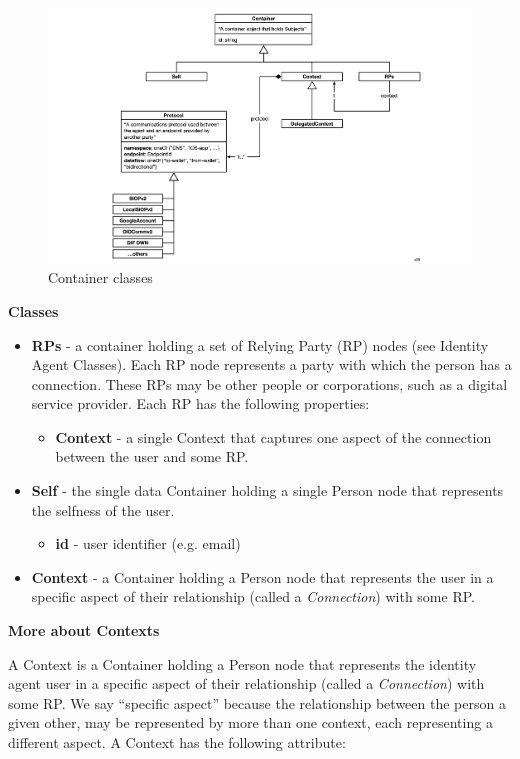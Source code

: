 \documentclass[11pt, oneside]{article}   	%
\begin{document}
\begin{figure}[h!]
\includegraphics[width=\textwidth]{./images/container-classes.png}
\caption{Container classes}
\label{fig:containers}
\end{figure} 

\textbf{Classes}

\begin{itemize}
	\item \textbf{RPs} - a container holding a set of Relying Party (RP) nodes (see Identity Agent Classes). Each RP node represents a party with which the person has a connection. These RPs may be other people or corporations, such as a digital service provider. Each RP has the following properties:
	\begin{itemize}
		\item \textbf{Context} - a single Context that captures one aspect of the connection between the user and some RP.
	\end{itemize}
	\item \textbf{Self} - the single data Container holding a single Person node that represents the selfness of the user.
	\begin{itemize}
		\item \textbf{id} - user identifier (e.g. email)
	\end{itemize}
	\item \textbf{Context} - a Container holding a Person node that represents the user in a specific aspect of their relationship (called a \emph{Connection}) with some RP. 
\end{itemize}

\textbf{More about Contexts}

A Context is a Container holding a Person node that represents the identity agent user in a specific aspect of their relationship (called a \emph{Connection}) with some RP. We say ``specific aspect'' because the relationship between the person a given other, may be represented by more than one context, each representing a different aspect. A Context has the following attribute:
\end{document}
